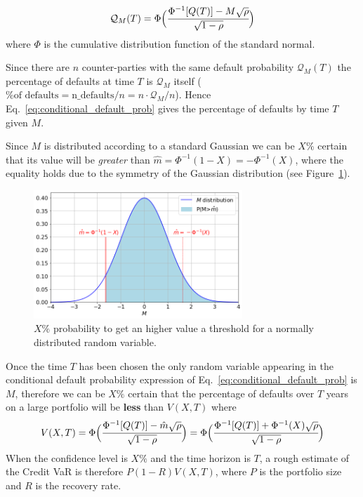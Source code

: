 \begin{equation}
\mathcal{Q}_M(T) = \Phi\Big(\cfrac{\Phi^{-1}[Q(T)]-M\sqrt{\rho}}{\sqrt{1-\rho}}\Big)
\label{eq:conditional_default_prob}
\end{equation}
where $\Phi$ is the cumulative distribution function of the standard normal.

Since there are $n$ counter-parties with the same default probability $\mathcal{Q}_M(T)$ the percentage of defaults at time $T$ is $\mathcal{Q}_M$ itself ($\textrm{\% of defaults} = \textrm{n\_defaults}/n = n\cdot \mathcal{Q}_M/n$). Hence Eq.~\ref{eq:conditional_default_prob} gives the percentage of defaults by time $T$ given $M$. 

Since $M$ is distributed according to a standard Gaussian we can be $X\%$ certain that its value will be \emph{greater} than $\hat{m} = \Phi^{-1}(1-X)=-\Phi^{-1}(X)$, where the equality holds due to the symmetry of the Gaussian distribution (see Figure~\ref{fig:certain_for_X}).

\begin{figure}[htb]
\centering
\includegraphics[width=0.7\textwidth]{figures/certain_for_X}
\caption{$X\%$ probability to get an higher value a threshold for a normally distributed random variable.}
\label{fig:certain_for_X}
\end{figure} 

Once the time $T$ has been chosen the only random variable appearing in the conditional default probability expression of Eq.~\ref{eq:conditional_default_prob} is $M$, therefore we can be $X\%$ certain that the percentage of defaults over $T$ years on a large portfolio will be \textbf{less} than $V(X,T)$ where
\[
V(X,T)= \Phi\Big(\cfrac{\Phi^{-1}[Q(T)]-\hat{m}\sqrt{\rho}}{\sqrt{1-\rho}}\Big) = \Phi\Big(\cfrac{\Phi^{-1}[Q(T)]+\Phi^{-1}(X)\sqrt{\rho}}{\sqrt{1-\rho}}\Big)
\]
When the confidence level is $X\%$ and the time horizon is $T$, a rough estimate of the Credit VaR is therefore $P(1-R)V(X,T)$, where $P$ is the portfolio size and $R$ is the recovery rate.

